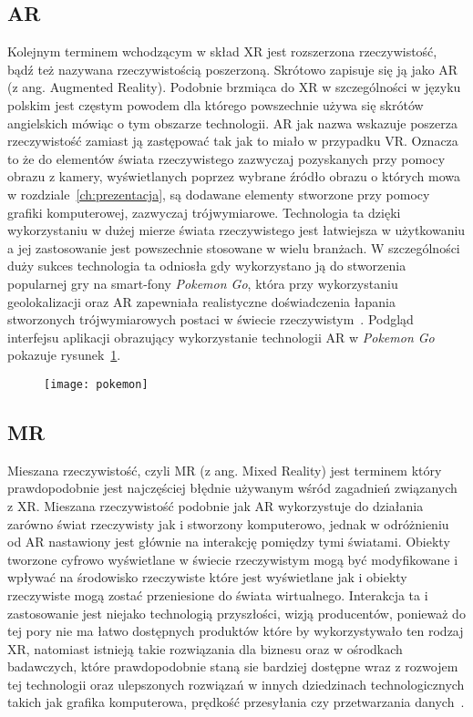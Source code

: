 	\subsection{AR}
	\label{subsec:ar}
	Kolejnym terminem wchodzącym w skład XR jest rozszerzona rzeczywistość, bądź też nazywana rzeczywistością poszerzoną. Skrótowo zapisuje się ją jako AR (z ang. Augmented Reality). Podobnie brzmiąca do XR w szczególności w języku polskim jest częstym powodem dla którego powszechnie używa się skrótów angielskich mówiąc o tym obszarze technologii. AR jak nazwa wskazuje poszerza rzeczywistość zamiast ją zastępować tak jak to miało w przypadku VR. Oznacza to że do elementów świata rzeczywistego zazwyczaj pozyskanych przy pomocy obrazu z kamery, wyświetlanych poprzez wybrane źródło obrazu o których mowa w rozdziale~\ref{ch:prezentacja}, są dodawane elementy stworzone przy pomocy grafiki komputerowej, zazwyczaj trójwymiarowe. Technologia ta dzięki wykorzystaniu w dużej mierze świata rzeczywistego jest łatwiejsza w użytkowaniu a jej zastosowanie jest powszechnie stosowane w wielu branżach. W szczególności duży sukces technologia ta odniosła gdy wykorzystano ją do stworzenia popularnej gry na smart-fony \textit{Pokemon Go}, która przy wykorzystaniu geolokalizacji oraz AR zapewniała realistyczne doświadczenia łapania stworzonych trójwymiarowych postaci w świecie rzeczywistym~\cite{terms}. Podgląd interfejsu aplikacji obrazujący wykorzystanie technologii AR  w \textit{Pokemon Go} pokazuje rysunek~\ref{fig:pokemon}.
	
\begin{figure}[h]
\centering
\texttt{[image: pokemon]}
\label{fig:pokemon}
\end{figure}

	\subsection{MR}
	\label{subsec:mr}	
	Mieszana rzeczywistość, czyli MR (z ang. Mixed Reality) jest terminem który prawdopodobnie jest najczęściej błędnie używanym wśród zagadnień związanych z XR. Mieszana rzeczywistość podobnie jak AR wykorzystuje do działania zarówno świat rzeczywisty jak i stworzony komputerowo, jednak w odróżnieniu od AR nastawiony jest głównie na interakcję pomiędzy tymi światami. Obiekty tworzone cyfrowo wyświetlane w świecie rzeczywistym mogą być modyfikowane i wpływać na środowisko rzeczywiste które jest wyświetlane jak i obiekty rzeczywiste mogą zostać przeniesione do świata wirtualnego. Interakcja ta i zastosowanie jest niejako technologią przyszłości, wizją producentów, ponieważ do tej pory nie ma łatwo dostępnych produktów które by wykorzystywało ten rodzaj XR, natomiast istnieją takie rozwiązania dla biznesu oraz w ośrodkach badawczych, które prawdopodobnie staną sie bardziej dostępne wraz z rozwojem tej technologii oraz ulepszonych rozwiązań w innych dziedzinach technologicznych takich jak grafika komputerowa, prędkość przesyłania czy przetwarzania danych~\cite{terms}.
